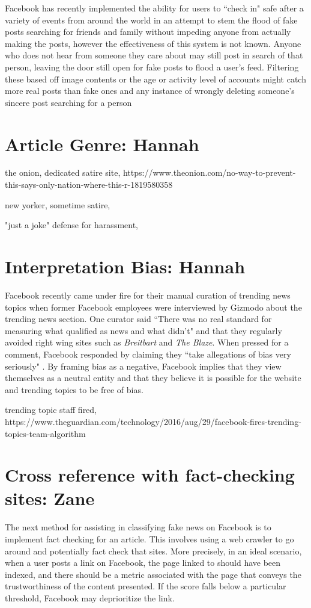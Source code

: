 \documentclass[12pt]{article}
\begin{document}
Facebook has recently implemented the ability for users to ``check in" safe after a variety of events from around the world in an attempt to stem the flood of fake posts searching for friends and family without impeding anyone from actually making the posts, however the effectiveness of this system is not known. Anyone who does not hear from someone they care about may still post in search of that person, leaving the door still open for fake posts to flood a user's feed. Filtering these based off image contents or the age or activity level of accounts might catch more real posts than fake ones and any instance of wrongly deleting someone's sincere post searching for a person 

\section{Article Genre: Hannah}

the onion, dedicated satire site, https://www.theonion.com/no-way-to-prevent-this-says-only-nation-where-this-r-1819580358

new yorker, sometime satire, 

"just a joke" defense for harassment, 



\section{Interpretation Bias: Hannah}
Facebook recently came under fire for their manual curation of trending news topics when former Facebook employees were interviewed by Gizmodo about the trending news section. One curator said ``There was no real standard for measuring what qualified as news and what didn't" and that they regularly avoided right wing sites such as \textit{Breitbart} and \textit{The Blaze}. When pressed for a comment, Facebook responded by claiming they ``take allegations of bias very seriously" \citep{gizmodo_fb_news_curation}. By framing bias as a negative, Facebook implies that they view themselves as a neutral entity and that they believe it is possible for the website and trending topics to be free of bias.


trending topic staff fired, https://www.theguardian.com/technology/2016/aug/29/facebook-fires-trending-topics-team-algorithm



\section{Cross reference with fact-checking sites: Zane}
The next method for assisting in classifying fake news on Facebook is to implement fact checking for an article. This involves using a web crawler to go around and potentially fact check that sites. More precisely, in an ideal scenario, when a user posts a link on Facebook, the page linked to should have been indexed, and there should be a metric associated with the page that conveys the trustworthiness of the content presented. If the score falls below a particular threshold, Facebook may deprioritize the link.  
\end{document}
